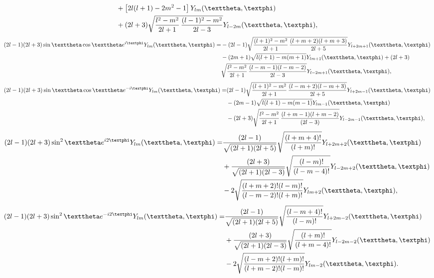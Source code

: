 \begin{fleqn}
\begin{align}
&+\left[2 l(l+1)-2 m^{2}-1\right] Y_{l m}(\vartheta, \varphi)
\notag\\
&
+(2 l+3) \sqrt{\frac{l^{2}-m^{2}}{2 l+1} \, \frac{(l-1)^{2}-m^{2}}{2 l-3}} Y_{l-2 m}(\vartheta, \varphi), \label{eq:5:7:5}
\end{align}
\begin{align}
 (2 l-1)(2 l+3) \sin \vartheta \cos \vartheta e^{i \varphi} Y_{l m}(\vartheta, \varphi)=&-(2 l-1) \sqrt{\frac{(l+1)^{2}-m^{2}}{2 l+1} \, \frac{(l+m+2)(l+m+3)}{2 l+5}} Y_{l+2 m+1}(\vartheta, \varphi)  \notag\\
& -(2 m+1) \sqrt{l(l+1)-m(m+1)} Y_{l m+1}(\vartheta, \varphi)+(2 l+3)\notag\\&
 \sqrt{\frac{l^{2}-m^{2}}{2 l+1} \, \frac{(l-m-1)(l-m-2)}{2 l-3}} Y_{l-2 m+1}(\vartheta, \varphi), \label{eq:5:7:6}
\end{align}
\begin{align}
 (2 l-1)(2 l+3) \sin \vartheta \cos \vartheta e^{-i \varphi} Y_{l m}(\vartheta, \varphi)=&(2 l-1) \sqrt{\frac{(l+1)^{2}-m^{2}}{2 l+1} \, \frac{(l-m+2)(l-m+3)}{2 l+5}} Y_{l+2 m-1}(\vartheta, \varphi)  \notag\\
& -(2 m-1) \sqrt{l(l+1)-m(m-1)} Y_{l m-1}(\vartheta, \varphi)
\notag\\&-(2 l+3) \sqrt{\frac{l^{2}-m^{2}}{2 l+1} \, \frac{(l+m-1)(l+m-2)}{(2 l-3)}} Y_{l-2 m-1}(\vartheta, \varphi), \label{eq:5:7:7}
\end{align}
\begin{align}
(2 l-1)(2 l+3) \sin ^{2} \vartheta e^{i 2 \varphi} Y_{l m}(\vartheta, \varphi)=&\frac{(2 l-1)}{\sqrt{(2 l+1)(2 l+5)}} \sqrt{\frac{(l+m+4)!}{(l+m)!}} Y_{l+2 m+2}(\vartheta, \varphi)  \notag\\
&+  \frac{(2 l+3)}{\sqrt{(2 l+1)(2 l-3)}} \sqrt{\frac{(l-m)!}{(l-m-4)!}} Y_{l-2 m+2}(\vartheta, \varphi)
\notag\\&
-2 \sqrt{\frac{(l+m+2)!(l-m)!}{(l-m-2)!(l+m)!}} Y_{l m+2}(\vartheta, \varphi), \label{eq:5:7:8}
\end{align}
\begin{align}
(2 l-1)(2 l+3) \sin ^{2} \vartheta e^{-i 2 \varphi} Y_{l m}(\vartheta, \varphi)=&\frac{(2 l-1)}{\sqrt{(2 l+1)(2 l+5)}} \sqrt{\frac{(l-m+4)!}{(l-m)!}} Y_{l+2 m-2}(\vartheta, \varphi)  \notag\\
& +\frac{(2 l+3)}{\sqrt{(2 l+1)(2 l-3)}} \sqrt{\frac{(l+m)!}{(l+m-4)!}} Y_{l-2 m-2}(\vartheta, \varphi)
\notag\\&
-2 \sqrt{\frac{(l-m+2)!(l+m)!}{(l+m-2)!(l-m)!}} Y_{l m-2}(\vartheta, \varphi). \label{eq:5:7:9}
\end{align}
\end{fleqn}

